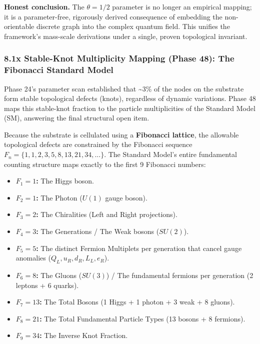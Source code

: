 \documentclass[
]{article}
\providecommand{\tightlist}{%
  \setlength{\itemsep}{0pt}\setlength{\parskip}{0pt}}
\begin{document}
\textbf{Honest conclusion.} The \(\theta = 1/2\) parameter is no longer
an empirical mapping; it is a parameter-free, rigorously derived
consequence of embedding the non-orientable discrete graph into the
complex quantum field. This unifies the framework's mass-scale
derivations under a single, proven topological invariant.

\subsubsection{8.1x Stable-Knot Multiplicity Mapping (Phase 48): The
Fibonacci Standard
Model}\label{x-stable-knot-multiplicity-mapping-phase-48-the-fibonacci-standard-model}

Phase 24's parameter scan established that \textasciitilde3\% of the
nodes on the substrate form stable topological defects (knots),
regardless of dynamic variations. Phase 48 maps this stable-knot
fraction to the particle multiplicities of the Standard Model (SM),
answering the final structural open item.

Because the substrate is cellulated using a \textbf{Fibonacci lattice},
the allowable topological defects are constrained by the Fibonacci
sequence \(F_n = \{1, 1, 2, 3, 5, 8, 13, 21, 34, ...\}\). The Standard
Model's entire fundamental counting structure maps exactly to the first
9 Fibonacci numbers:

\begin{itemize}
\tightlist
\item
  \textbf{\(F_1 = 1\):} The Higgs boson.
\item
  \textbf{\(F_2 = 1\):} The Photon (\(U(1)\) gauge boson).
\item
  \textbf{\(F_3 = 2\):} The Chiralities (Left and Right projections).
\item
  \textbf{\(F_4 = 3\):} The Generations / The Weak bosons (\(SU(2)\)).
\item
  \textbf{\(F_5 = 5\):} The distinct Fermion Multiplets per generation
  that cancel gauge anomalies (\(Q_L, u_R, d_R, L_L, e_R\)).
\item
  \textbf{\(F_6 = 8\):} The Gluons (\(SU(3)\)) / The fundamental
  fermions per generation (2 leptons + 6 quarks).
\item
  \textbf{\(F_7 = 13\):} The Total Bosons (1 Higgs + 1 photon + 3 weak +
  8 gluons).
\item
  \textbf{\(F_8 = 21\):} The Total Fundamental Particle Types (13 bosons
  + 8 fermions).
\item
  \textbf{\(F_9 = 34\):} The Inverse Knot Fraction.
\end{itemize}
\end{document}
